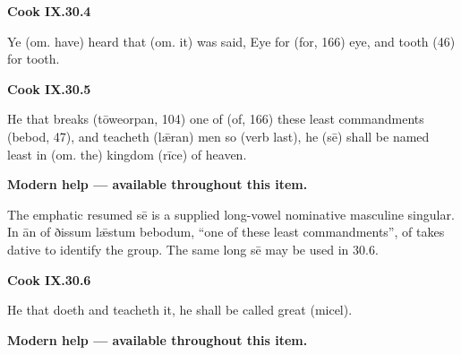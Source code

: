 \par\begin{minipage}{\linewidth}\raggedright
\textbf{Cook IX.30.4}

Ye (om. have) heard that (om. it) was said, Eye for (for, 166) eye, and tooth (46) for tooth.

\end{minipage}\par\addvspace{4pt}

\par\begin{minipage}{\linewidth}\raggedright
\textbf{Cook IX.30.5}

He that breaks (tōweorpan, 104) one of (of, 166) these least commandments (bebod, 47), and teacheth (lǣran) men so (verb last), he (sē) shall be named least in (om. the) kingdom (rīce) of heaven.

\textbf{Modern help — available throughout this item.}

\end{minipage}\par\addvspace{4pt}

The emphatic resumed sē is a supplied long-vowel nominative masculine singular. In ān of ðissum lǣstum bebodum, “one of these least commandments”, of takes dative to identify the group. The same long sē may be used in 30.6.

\par\begin{minipage}{\linewidth}\raggedright
\textbf{Cook IX.30.6}

He that doeth and teacheth it, he shall be called great (micel).

\textbf{Modern help — available throughout this item.}

\end{minipage}\par\addvspace{4pt}

